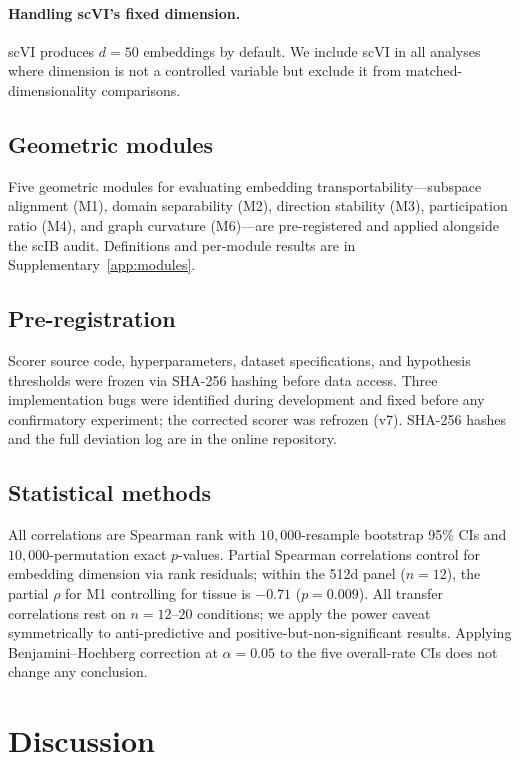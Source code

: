 \documentclass[11pt]{article}
\begin{document}
\paragraph{Handling scVI's fixed dimension.} scVI produces $d = 50$ embeddings by default. We include scVI in all analyses where dimension is not a controlled variable but exclude it from matched-dimensionality comparisons.

\subsection{Geometric modules}

Five geometric modules for evaluating embedding transportability---subspace alignment (M1), domain separability (M2), direction stability (M3), participation ratio (M4), and graph curvature (M6)---are pre-registered and applied alongside the scIB audit. Definitions and per-module results are in Supplementary~\ref{app:modules}.

\subsection{Pre-registration}

Scorer source code, hyperparameters, dataset specifications, and hypothesis thresholds were frozen via SHA-256 hashing before data access. Three implementation bugs were identified during development and fixed before any confirmatory experiment; the corrected scorer was refrozen (v7). SHA-256 hashes and the full deviation log are in the online repository.

\subsection{Statistical methods}

All correlations are Spearman rank with $10{,}000$-resample bootstrap 95\% CIs and $10{,}000$-permutation exact $p$-values. Partial Spearman correlations control for embedding dimension via rank residuals; within the 512d panel ($n = 12$), the partial $\rho$ for M1 controlling for tissue is $-0.71$ ($p = 0.009$). All transfer correlations rest on $n = 12$--$20$ conditions; we apply the power caveat symmetrically to anti-predictive and positive-but-non-significant results. Applying Benjamini--Hochberg correction at $\alpha = 0.05$ to the five overall-rate CIs does not change any conclusion.


\section{Discussion}
\label{sec:discussion}
\end{document}
